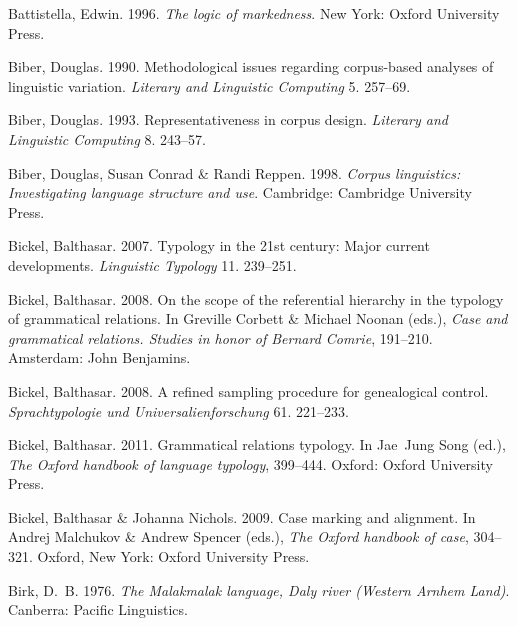 \documentclass[ number=1
			   ,series=sidl
				,url=http://langsci-press.org/catalog/book/18 
			   ,isbn=978-3-944675-19-0
			   ,output=long   %
			  ]{LSP/langsci}
\begin{document}
\begin{thebibliography}{190}
Battistella, Edwin. 1996.
\newblock \emph{The logic of markedness}.
\newblock New York: Oxford University Press.

Biber, Douglas. 1990.
\newblock Methodological issues regarding corpus-based analyses of linguistic
  variation.
\newblock \emph{Literary and Linguistic Computing} 5. 257--69.

Biber, Douglas. 1993.
\newblock Representativeness in corpus design.
\newblock \emph{Literary and Linguistic Computing} 8. 243--57.

Biber, Douglas, Susan Conrad \& Randi Reppen. 1998.
\newblock \emph{Corpus linguistics: {I}nvestigating language structure and
  use}.
\newblock Cambridge: Cambridge University Press.

Bickel, Balthasar. 2007.
\newblock Typology in the 21st century: {M}ajor current developments.
\newblock \emph{Linguistic Typology} 11. 239--251.

Bickel, Balthasar. 2008{}.
\newblock On the scope of the referential hierarchy in the typology of
  grammatical relations.
\newblock In Greville Corbett \& Michael Noonan (eds.), \emph{Case and
  grammatical relations. {S}tudies in honor of {B}ernard {C}omrie}, 191--210.
  Amsterdam: John Benjamins.

Bickel, Balthasar. 2008{}.
\newblock A refined sampling procedure for genealogical control.
\newblock \emph{Sprachtypologie und Universalienforschung} 61. 221--233.

Bickel, Balthasar. 2011.
\newblock Grammatical relations typology.
\newblock In Jae~Jung Song (ed.), \emph{The {O}xford handbook of language
  typology}, 399--444. Oxford: Oxford University Press.

Bickel, Balthasar \& Johanna Nichols. 2009.
\newblock Case marking and alignment.
\newblock In Andrej Malchukov \& Andrew Spencer (eds.), \emph{The {O}xford
  handbook of case}, 304--321. Oxford, New York: Oxford University Press.

Birk, D.~B. 1976.
\newblock \emph{The {M}alakmalak language, {D}aly river ({W}estern {A}rnhem
  {L}and)}.
\newblock Canberra: Pacific Linguistics.


\end{thebibliography}
\end{document}
